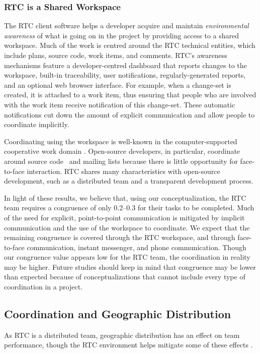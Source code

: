 \subsubsection{RTC is a Shared Workspace}
The RTC client software helps a developer acquire and maintain \emph{environmental awareness} of what is going on in the project by providing access to a shared workspace. Much of the work is centred around the RTC technical entities, which include plans, source code, work items, and comments.
RTC's awareness mechanisms feature a developer-centred dashboard that reports changes to the workspace, built-in traceability, user notifications, regularly-generated reports, and an optional web browser interface. For example, when a change-set is created, it is attached to a work item, thus ensuring that people who are involved with the work item receive notification of this change-set. These automatic notifications cut down the amount of explicit communication and allow people to coordinate implicitly.

Coordinating using the workspace is well-known in the computer-supported cooperative work domain \cite{schmidt1996}. Open-source developers, in particular, coordinate around source code~\cite{bolici:stc:2009} and mailing lists \cite{gutwin2004:awareness,mockus2002:opensource} because there is little opportunity for face-to-face interaction. RTC shares many characteristics with open-source development, such as a distributed team and a transparent development process.

In light of these results, we believe that, using our conceptualization, the RTC team requires a congruence of only 0.2--0.3 for their tasks to be completed.
Much of the need for explicit, point-to-point communication is mitigated by implicit communication and the use of the workspace to coordinate.
We expect that the remaining congruence is covered through the RTC workspace, and through face-to-face communication, instant messenger, and phone communication. Though our congruence value appears low for the RTC team, the coordination in reality may be higher. Future studies should keep in mind that congruence may be lower than expected because of conceptualizations that cannot include every type of coordination in a project.

\subsection{Coordination and Geographic Distribution}
As RTC is a distributed team, geographic distribution has an effect on team performance, though the RTC environment helps mitigate some of these effects \cite{Nguyen:2008Distance}.

